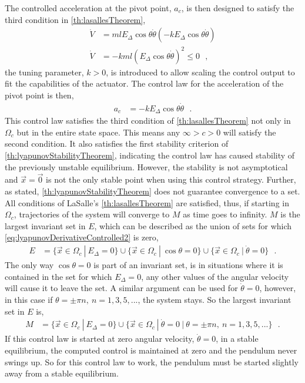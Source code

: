%
The controlled acceleration at the pivot point, $a_c$, is then designed to satisfy the third condition in \autoref{th:lasallesTheorem},
\begin{align}
  \dot{V} &= m l E_\Delta \cos \theta \dot{\theta} (-k E_\Delta \cos \theta \dot{\theta})     \label{eq:lyapunovDerivativeControlled1} \\
  \dot{V} &= -k m l (E_\Delta \cos \theta \dot{\theta})^2  \leq 0  \ \ \ ,   \label{eq:lyapunovDerivativeControlled2} 
\end{align}
the tuning parameter, $k>0$, is introduced to allow scaling the control output to fit the capabilities of the actuator. The control law for the acceleration of the pivot point is then,
\begin{align}
  a_c &= -k E_\Delta \cos \theta \dot{\theta}  \ \ \ .  \label{eq:accControlLaw}
\end{align}
This control law satisfies the third condition of \autoref{th:lasallesTheorem} not only in $\Omega_c$ but in the entire state space. This means any $\infty>c>0$ will satisfy the second condition. It also satisfies the first stability criterion of \autoref{th:lyapunovStabilityTheorem}, indicating the control law has caused stability of the previously unstable equilibrium. However, the stability is not asymptotical and $\vec{x} = \vec{0}$ is not the only stable point when using this control strategy. Further, as stated, \autoref{th:lyapunovStabilityTheorem} does not guarantee convergence to a set.\\
All conditions of LaSalle's \autoref{th:lasallesTheorem} are satisfied, thus, if starting in $\Omega_c$, trajectories of the system will converge to $M$ as time goes to infinity. $M$ is the largest invariant set in $E$, which can be described as the union of sets for which \autoref{eq:lyapunovDerivativeControlled2} is zero,
\begin{align}
  E  &= \{ \vec{x} \in \Omega_c \ | \ E_\Delta = 0 \} \cup  \{ \vec{x} \in \Omega_c \ | \  \cos \theta = 0 \} \cup  \{ \vec{x} \in \Omega_c \ | \ \dot{\theta} = 0 \} \ \ \ . \label{eq:E}
\end{align}
The only way $\cos \theta = 0$ is part of an invariant set, is in situations where it is contained in the set for which $E_\Delta = 0$, any other values of the angular velocity will cause it to leave the set. A similar argument can be used for $\dot{\theta} = 0$, however, in this case if $\theta = \pm \pi n , \ n = 1, 3, 5, ...$, the system stays. So the largest invariant set in $E$ is,
\begin{align}
  M  &= \{ \vec{x} \in \Omega_c \ | \ E_\Delta = 0 \} \cup  \{ \vec{x} \in \Omega_c \ | \ \dot{\theta} = 0 \ | \ \theta = \pm \pi n , \ n = 1, 3, 5, ... \} \ \ \ .  \label{eq:M}
\end{align}
%
If this control law is started at zero angular velocity, $\dot{\theta} = 0$, in a stable equilibrium, the computed control is maintained at zero and the pendulum never swings up. So for this control law to work, the pendulum must be started slightly away from a stable equilibrium.

